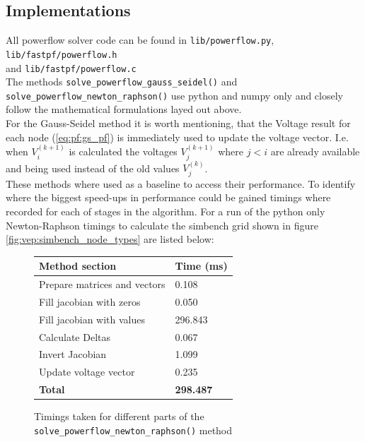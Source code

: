 \subsection{Implementations}

All powerflow solver code can be found in 
\texttt{lib/powerflow.py}, \texttt{lib/fastpf/powerflow.h}
\\ and
\texttt{lib/fastpf/powerflow.c}\\

The methods \texttt{solve\_powerflow\_gauss\_seidel()}
and \texttt{solve\_powerflow\_newton\_raphson()}
use python and numpy only and closely follow the mathematical formulations layed out above.\\

For the Gauss-Seidel method it is worth mentioning, that the Voltage result for each
node (\ref{eq:pf:gs_pf}) is immediately used to update the voltage vector. I.e. when $V_i^{(k+1)}$
is calculated the voltages $V_{j}^{(k+1)}$ where $j<i$ are already available and being used instead of
the old values $V_{j}^{(k)}$.\\

These methods where used as a baseline to access their performance. To identify where the biggest
speed-ups in performance could be gained timings where recorded for each of stages in the algorithm.
For a run of the python only Newton-Raphson timings to calculate the simbench grid shown in figure
\ref{fig:vep:simbench_node_types} are listed below:

\vspace{.5cm}

\begin{figure}[H]
    \begin{center}
        \begin{tabular}{ll}
            \textbf{Method section} & \textbf{Time (ms)}\\
            \hline
            Prepare matrices and vectors & 0.108\\
            Fill jacobian with zeros &  0.050\\
            Fill jacobian with values & 296.843\\
            Calculate Deltas &      0.067\\
            Invert Jacobian &      1.099\\
            Update voltage vector & 0.235\\
            \hline
            \textbf{Total} & \textbf{298.487}
        \end{tabular}
    \end{center}
\caption{Timings taken for different parts of the \texttt{solve\_powerflow\_newton\_raphson()} method}
\end{figure}
    
